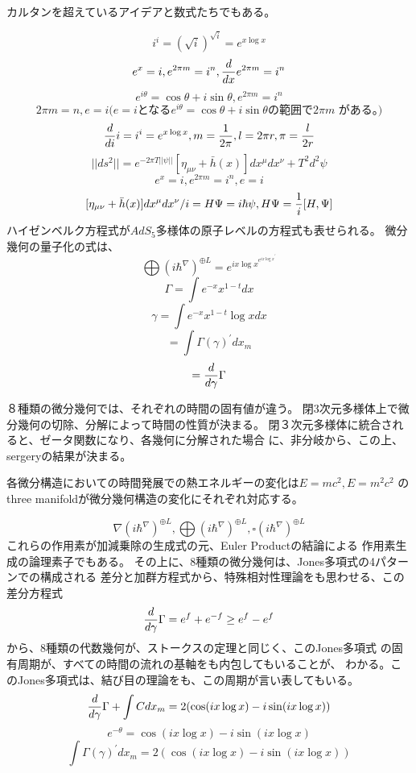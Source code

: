 \documentclass{jsarticle}
\begin{document}
   カルタンを超えているアイデアと数式たちでもある。

   $$ i^i = (\sqrt{i})^{\sqrt{i}} = e^{x \log x} $$
   $$ e^x = i, e^{2\pi m} = i^n, {d \over d x}e^{2\pi m} = i^n $$
   $$ e^{i \theta} = \cos \theta + i \sin \theta, e^{2 \pi m} = i^n $$
   $$ 2 \pi m = n, e = i \text{($e=i$となる$e^{i \theta} = \cos \theta 
   + i \sin \theta $
   の範囲で$2\pi m$ がある。)}$$
   $$ {d \over d i}i = i^i = e^{x \log x}, m={1 \over 2 \pi},l=2\pi r, 
   \pi = {l \over 2r} $$
   $$ ||ds^2|| = e^{-2 \pi T||\psi||}[\eta_{\mu\nu} + \bar{h}(x)]
   dx^{\mu}dx^{\nu} + T^2 d^2 \psi $$
   $$ e^x = i, e^{2\pi m} = i^n, e = i $$
   $$ {{[\eta_{\mu\nu} + \bar{h}(x)]dx^{\mu}dx^{\nu}}/i} = H \Psi
   = i \hbar \psi, H \Psi = {1 \over i}[H, \Psi] $$
   ハイゼンベルク方程式が$ AdS_5 $多様体の原子レベルの方程式も表せられる。 
   微分幾何の量子化の式は、
   $$ \bigoplus {({i \hbar} ^{\nabla})}^{\oplus L} = e^{{i x \log x}^{
	   {e^{i x \log x}}^{'}}} $$
   $$ \Gamma = \int e^{-x}x^{1 - t}dx $$
   $$ \gamma = \int e^{-x}x^{1 - t}\log x dx $$
   $$ = \int \Gamma(\gamma)^{'} dx_m$$
   $$ = {d \over d \gamma}\Gamma $$

   ８種類の微分幾何では、それぞれの時間の固有値が違う。
   閉3次元多様体上で微分幾何の切除、分解によって時間の性質が決まる。
   閉３次元多様体に統合されると、ゼータ関数になり、各幾何に分解された場合
   に、非分岐から、この上、sergeryの結果が決まる。

   各微分構造においての時間発展での熱エネルギーの変化は$E=mc^2, E=m^2 c^2 $
   のthree manifoldが微分幾何構造の変化にそれぞれ対応する。

   $$ \nabla ({i \hbar^{\nabla}})^{\oplus L}, \bigoplus ({i \hbar^{\nabla}})^{
	   \oplus L}, \square ({i \hbar^{\nabla}})^{\oplus L} $$
   これらの作用素が加減乗除の生成式の元、Euler Productの結論による
   作用素生成の論理素子でもある。
   その上に、8種類の微分幾何は、Jones多項式の4パターンでの構成される
   差分と加群方程式から、特殊相対性理論をも思わせる、この差分方程式
   $$ {d \over d \gamma}\Gamma = e^{f} + e^{-f} \ge e^{f} - e^{f} $$
   から、8種類の代数幾何が、ストークスの定理と同じく、このJones多項式
   の固有周期が、すべての時間の流れの基軸をも内包してもいることが、
   わかる。このJones多項式は、結び目の理論をも、この周期が言い表してもいる。
   $$ {d \over d \gamma}\Gamma + \int C dx_m = 2(\cos(i x \log x) - i \sin
   (i x \log x)) $$
    $$ e^{- \theta} = \cos(i x \log x) - i \sin(i x \log x)$$
    $$ \int \Gamma(\gamma)^{'}dx_m = 2(\cos (i x \log x) 
    - i \sin(i x \log x)) $$
\end{document}
